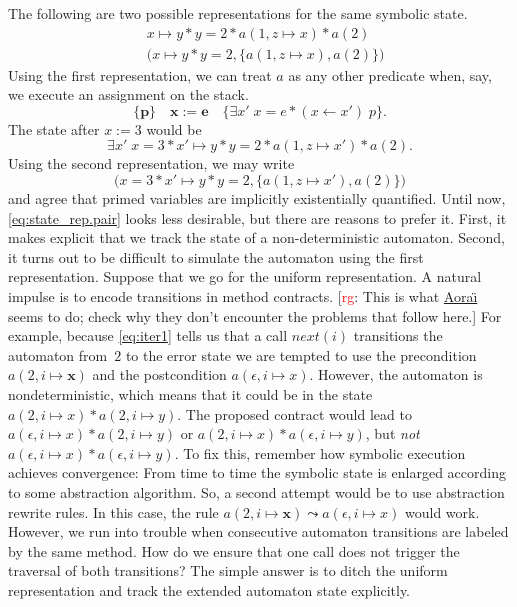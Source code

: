 \documentclass[a4paper]{article}
\newcommand{\todo}[2]{{\small [\textcolor{red}{#1}: #2]}}
\newcommand{\rg}[1]{\todo{rg}{#1}}
\theoremstyle{slanted}
\theoremstyle{definition}
\theoremstyle{remark}
\begin{document}
The following are two possible representations for the same symbolic state.
\begin{align}
& x\mapsto y * y = 2 * a(1, z\mapsto x) * a(2) 
  \label{eq:state_rep.star} \\
& \bigl(x\mapsto y * y = 2, \{a(1,z\mapsto x), a(2)\}\bigr)
  \label{eq:state_rep.pair}
\end{align}
Using the first representation, we can treat $a$ as any other predicate when, say, we execute an assignment on the stack.
  \[ \{\mathbf p\}\quad
  \mathbf x:=\mathbf e
  \quad\{\exists x'\;x=e * (x\gets x')\;p\}.\]
The state after $x:=3$ would be
  \[ \exists x'\; x = 3 * x'\mapsto y * y = 2 * a(1, z\mapsto x') * a(2). \]
Using the second representation, we may write
  \[ \bigl(x=3 * x'\mapsto y * y=2, \{a(1,z\mapsto x'), a(2)\}\bigr) \]
and agree that primed variables are implicitly existentially quantified.
Until now, \eqref{eq:state_rep.pair} looks less desirable, but there are reasons to prefer it. 
First, it makes explicit that we track the state of a non-deterministic automaton.
Second, it turns out to be difficult to simulate the automaton using the first representation.
Suppose that we go for the uniform representation.
A natural impulse is to encode transitions in method contracts.
\rg{This is what \href{http://amazones.gforge.inria.fr/aorai/aorai-manual.pdf}{Aora\"\i} seems to do; check why they don't encounter the problems that follow here.}
For example, because \eqref{eq:iter1} tells us that a call $\mathit{next}(i)$ transitions the automaton from~$2$ to the error state we are tempted to use the precondition $a(2,i\mapsto\mathbf{x})$ and the postcondition $a(\epsilon,i\mapsto x)$.
However, the automaton is nondeterministic, which means that it could be in the state $a(2,i\mapsto x) * a(2,i\mapsto y)$.
The proposed contract would lead to $a(\epsilon,i\mapsto x) * a(2,i\mapsto y)$ or $a(2,i\mapsto x) * a(\epsilon,i\mapsto y)$, but \emph{not} $a(\epsilon,i\mapsto x) * a(\epsilon,i\mapsto y)$.
To fix this, remember how symbolic execution achieves convergence:
From time to time the symbolic state is enlarged according to some abstraction algorithm.
So, a second attempt would be to use abstraction rewrite rules.
In this case, the rule $a(2,i\mapsto\mathbf{x})\leadsto a(\epsilon,i\mapsto x)$ would work.
However, we run into trouble when consecutive automaton transitions are labeled by the same method.
How do we ensure that one call does not trigger the traversal of both transitions?
The simple answer is to ditch the uniform representation and track the extended automaton state explicitly.
\end{document}

